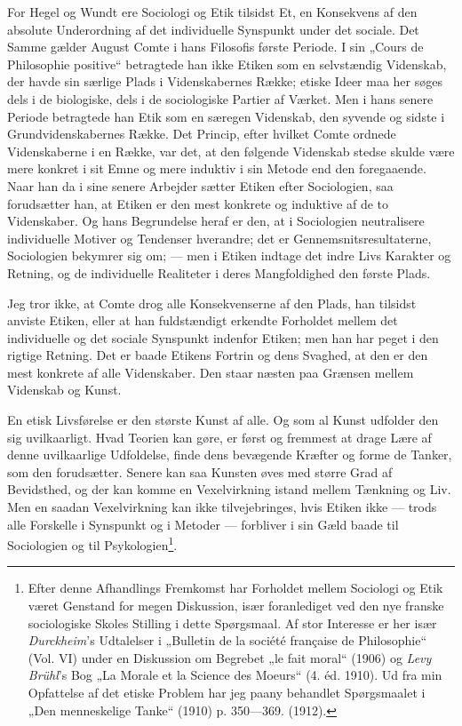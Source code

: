 \documentclass[12pt,a4paper,openany]{book}
\newcommand{\opage}[1]{\marginnote{\footnotesize\textit{[#1]}}}
\begin{document}
For Hegel og Wundt ere Sociologi og Etik tilsidst Et, en
Konsekvens af den absolute Underordning af det individuelle
Synspunkt under det sociale. Det Samme gælder August Comte
i hans Filosofis første Periode. I sin „Cours de Philosophie
positive“ betragtede han ikke Etiken som en selvstændig Videnskab,
der havde sin særlige Plads i Videnskabernes Række;
etiske Ideer maa her søges dels i de biologiske, dels i de
sociologiske Partier af Værket. Men i hans senere Periode
betragtede han Etik som en særegen Videnskab, den syvende
og sidste i Grundvidenskabernes Række. Det Princip, efter
hvilket Comte ordnede Videnskaberne i en Række, var det, at
den følgende Videnskab stedse skulde være mere konkret i sit
Emne og mere induktiv i sin Metode end den foregaaende.
Naar han da i sine senere Arbejder sætter Etiken efter Sociologien,
saa forudsætter han, at Etiken er den mest konkrete
og induktive af de to Videnskaber. Og hans Begrundelse heraf
er den, at i Sociologien neutralisere individuelle Motiver og
Tendenser hverandre; det er Gennemsnitsresultaterne, Sociologien
bekymrer sig om; --- men i Etiken indtage det indre
Livs Karakter og Retning, og de individuelle Realiteter i deres
Mangfoldighed den første Plads.

Jeg tror ikke, at Comte drog alle Konsekvenserne af den
Plads, han tilsidst anviste Etiken, eller at han fuldstændigt
erkendte Forholdet mellem det individuelle og det sociale Synspunkt
indenfor Etiken; men han har peget i den rigtige Retning.
Det er baade Etikens Fortrin og dens Svaghed, at den
er den mest konkrete af alle Videnskaber. Den staar næsten
paa Grænsen mellem Videnskab og Kunst.

En etisk Livsførelse er den største Kunst af alle. Og
som al Kunst udfolder den sig uvilkaarligt. Hvad Teorien kan
gøre, er først og fremmest at drage Lære af denne uvilkaarlige
Udfoldelse, finde dens bevægende Kræfter og forme de Tanker,
som den forudsætter. Senere kan saa Kunsten øves med større
\setcounter{footnote}{0}%
\opage{77}Grad af Bevidsthed, og der kan komme en Vexelvirkning istand
mellem Tænkning og Liv. Men en saadan Vexelvirkning kan
ikke tilvejebringes, hvis Etiken ikke --- trods alle Forskelle i
Synspunkt og i Metoder --- forbliver i sin Gæld baade til
Sociologien og til Psykologien\footnote[1]{Efter denne Afhandlings Fremkomst har Forholdet mellem Sociologi og Etik været Genstand for megen Diskussion, især foranlediget ved den nye franske sociologiske Skoles Stilling i dette Spørgsmaal. Af stor Interesse er her især \emph{Durckheim}’s Udtalelser i „Bulletin de la société française de Philosophie“ (Vol. VI) under en Diskussion om Begrebet „le fait moral“ (1906) og \emph{Levy Brühl}’s Bog „La Morale et la Science des Moeurs“ (4. éd. 1910). Ud fra min Opfattelse af det etiske Problem har jeg paany behandlet Spørgsmaalet i „Den menneskelige Tanke“ (1910) p. 350---369. (1912).}.
\end{document}
